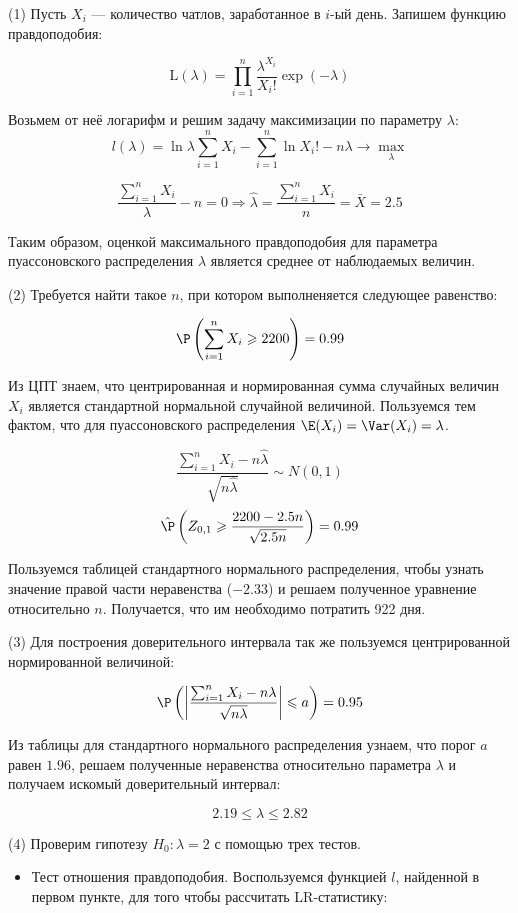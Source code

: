 \documentclass[pdftex,11pt,openany]{book}\usepackage[]{graphicx}\usepackage[]{color}
\begin{document}
\begin{solution}

(1) Пусть $X_i$ --- количество чатлов, заработанное в $i$-ый день. Запишем функцию правдоподобия:

\[\text{L}(\lambda) = \prod_{i=1}^n \frac{\lambda^{X_i}}{X_i!}\exp(-\lambda)\]

Возьмем от неё логарифм и решим задачу максимизации по параметру $\lambda$:
\[l(\lambda) = \ln \lambda \sum_{i=1}^n X_i - \sum_{i=1}^n \ln X_i! - n\lambda \to \max_\lambda\]

\[\frac{\sum_{i=1}^{n}X_i}{\lambda} - n = 0 \Rightarrow \hat{\lambda} = \frac{\sum_{i=1}^{n}X_i}{n} = \bar{X}=2.5\]

Таким образом, оценкой максимального правдоподобия для параметра пуассоновского распределения $\lambda$ является среднее от наблюдаемых величин.

(2) Требуется найти такое $n$, при котором выполненяется следующее равенство:

\[\P\left( \sum_{i=1}^{n}X_i \geqslant 2200\right) =0.99\]

Из ЦПТ знаем, что центрированная и нормированная сумма случайных величин $X_i$ является стандартной нормальной случайной величиной. Пользуемся тем фактом, что для пуассоновского распределения $\E(X_i) = \Var(X_i) = \lambda$.

\[\frac{\sum_{i=1}^{n}X_i-n\hat{\lambda}}{\sqrt{n\hat{\lambda}}} \sim N(0,1)\]
\[\hat{\P}\left( Z_{0,1} \geqslant \frac{2200-2.5n}{\sqrt{2.5n}}\right) = 0.99\]

Пользуемся таблицей стандартного нормального распределения, чтобы узнать значение правой части неравенства ($-2.33$) и решаем полученное уравнение относительно $n$. Получается, что им необходимо потратить 922 дня.

(3) Для построения доверительного интервала так же пользуемся центрированной нормированной величиной:

\[\P\left( \left|\frac{\sum_{i=1}^{n}X_i-n\lambda}{\sqrt{n\lambda}}\right|\leqslant a\right)=0.95\]

Из таблицы для стандартного нормального распределения узнаем, что порог $a$ равен $1.96$, решаем полученные неравенства относительно параметра $\lambda$ и получаем искомый доверительный интервал:

\[2.19 \leqslant \lambda \leqslant 2.82\]

(4) Проверим гипотезу $H_0: \lambda = 2$ с помощью трех тестов.

\begin{itemize}
  \item Тест отношения правдоподобия. Воспользуемся функцией $l$, найденной в первом пункте, для того чтобы рассчитать LR-статистику:


\end{itemize}
\end{solution}
\end{document}
